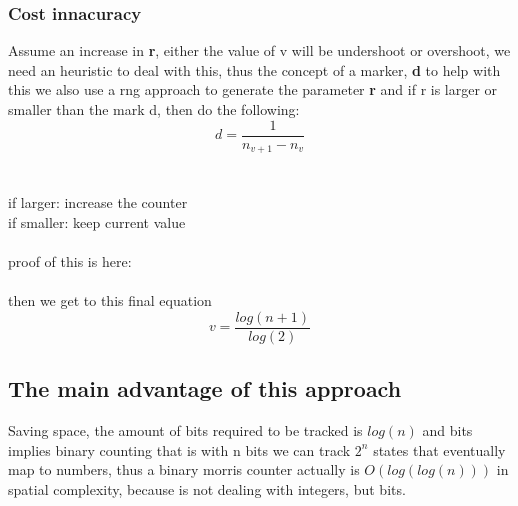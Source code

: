 \subsubsection{Cost innacuracy}

Assume an increase in \textbf{r}, either the value of v will be undershoot or overshoot, we need an heuristic to deal with this, thus the concept of a marker, \textbf{d}
to help with this we also use a rng approach to generate the parameter \textbf{r} and if r is larger or smaller than the mark d, then do the following:
\begin{equation}
	d = \frac{1}{n_{v+1} - n_v}
	\label{eq:parameter d}
\end{equation}
\\\\
if larger: increase the counter
\\
if smaller: keep current value
\\\\
proof of this is here: \cite{morris}
\\\\
then we get to this final equation
\begin{equation}
	v = \frac{log(n+1)}{log(2)}
	\label{eq:final computation of tracked value}
\end{equation}

\subsection{The main advantage of this approach}

Saving space, the amount of bits required to be tracked is $log(n)$ and bits implies binary counting that is with n bits we can track $2^n$ states that eventually map
to numbers, thus a binary morris counter actually is $O(log(log(n)))$ in spatial complexity, because is not dealing with integers, but bits.
